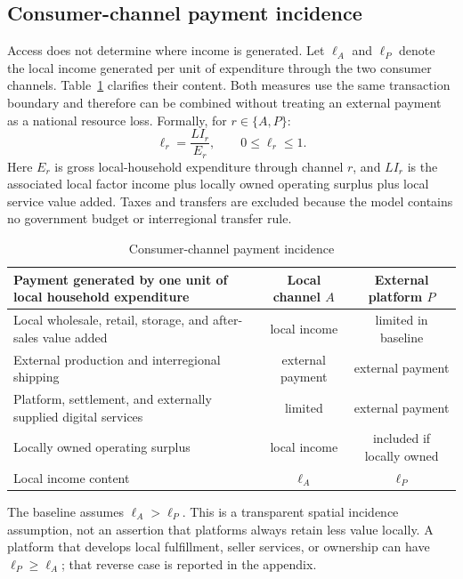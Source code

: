 \documentclass[11pt]{article}
\theoremstyle{definition}
\theoremstyle{remark}
\begin{document}
\subsection{Consumer-channel payment incidence}

Access does not determine where income is generated.  Let \(\ell_A\) and
\(\ell_P\) denote the local income generated per unit of expenditure through
the two consumer channels.  Table~\ref{tab:consumer_flows} clarifies their
content.  Both measures use the same transaction boundary and therefore can
be combined without treating an external payment as a national resource loss.
Formally, for \(r\in\{A,P\}\):
\begin{equation}
 \ell_r=\frac{LI_r}{E_r},
 \qquad 0\leq\ell_r\leq1.
 \label{eq:consumer_local_content_definition}
\end{equation}
Here \(E_r\) is gross local-household expenditure through channel \(r\), and
\(LI_r\) is the associated local factor income plus locally owned operating
surplus plus local service value added.
Taxes and transfers are excluded because the model contains no government
budget or interregional transfer rule.

\begin{table}[htbp]
\centering
\caption{Consumer-channel payment incidence}
\label{tab:consumer_flows}
\begin{tabular}{p{}cc}
\toprule
Payment generated by one unit of local household expenditure
& Local channel \(A\) & External platform \(P\)\\
\midrule
Local wholesale, retail, storage, and after-sales value added
& local income & limited in baseline\\
External production and interregional shipping
& external payment & external payment\\
Platform, settlement, and externally supplied digital services
& limited & external payment\\
Locally owned operating surplus
& local income & included if locally owned\\
\midrule
Local income content
& \(\ell_A\) & \(\ell_P\)\\
\bottomrule
\end{tabular}
\end{table}

The baseline assumes \(\ell_A>\ell_P\).  This is a transparent spatial
incidence assumption, not an assertion that platforms always retain less
value locally.  A platform that develops local fulfillment, seller services,
or ownership can have \(\ell_P\geq\ell_A\); that reverse case is reported in
the appendix.
\end{document}
